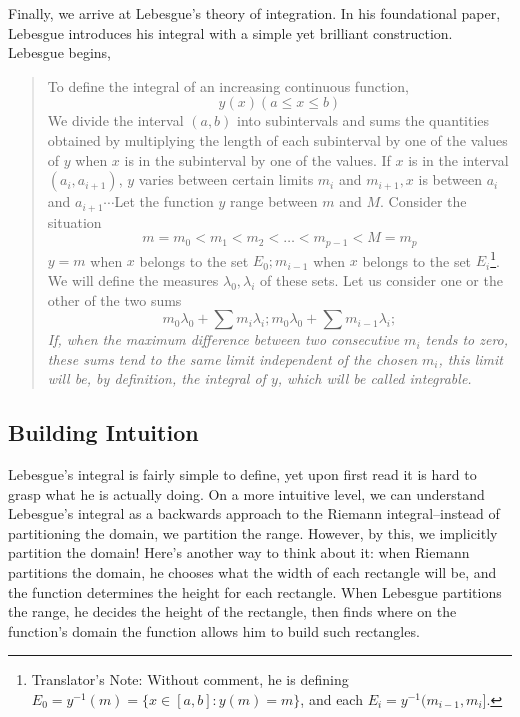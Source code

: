 \documentclass{article}
\theoremstyle{axiom} \newtheorem{axiom}{Axiom}
\theoremstyle{definition} \newtheorem{definition}{Definition}
\theoremstyle{example} \newtheorem{example}{Example}
\theoremstyle{proposition} \newtheorem{prop}{Proposition}
\theoremstyle{lemma} \newtheorem{lemma}{Lemma}
\begin{document}
Finally, we arrive at Lebesgue's theory of integration. In his foundational
paper, Lebesgue introduces his integral with a simple yet brilliant
construction. Lebesgue begins,

\begin{quote}
	To define the integral of an increasing continuous function,
	\begin{equation*}
		y(x) (a\leq x \leq b)
	\end{equation*}
	We divide the interval $(a,b)$ into subintervals and sums the quantities
	obtained by multiplying the length of each subinterval by one of the values 
	of $y$ when $x$ is in the subinterval by one of the values. If $x$ is in
	the interval $(a_i,a_{i+1})$, $y$ varies between certain limits 
	$m_i$ and $m_{i+1},x$ is between $a_i$ and $a_{i+1}$$\cdots$Let the function 
	$y$ range between $m$ and $M$. Consider the situation
	\begin{equation*}
		m = m_0 < m_1 < m_2 < \ldots < m_{p-1} < M = m_p
	\end{equation*}
	$y =m$ when $x$ belongs to the set $E_0; m_{i-1}$ when $x$ belongs to the set
	$E_i$\footnote{Translator's Note: Without comment, he is defining $E_0 = y^{-1}(m) = \{x \in
	[a,b]: y(m) = m\}$, and each $E_i = y^{-1}(m_{i-1},m_i]$.}. We will define
	the measures $\lambda_0,\lambda_i$ of these sets. Let us consider one or the
	other of the two sums
	\begin{equation*}
		m_0\lambda_0+\sum m_i\lambda_i;
		m_0\lambda_0+\sum m_{i-1}\lambda_i;
	\end{equation*}
	\textit{If, when the maximum difference between two consecutive $m_i$ tends
	to zero, these sums tend to the same limit independent of the chosen $m_i$,
	this limit will be, by definition, the integral of $y$, which will be called
	integrable.}
\end{quote}

\subsection{Building Intuition}

Lebesgue's integral is fairly simple to define, yet upon first read it is hard 
to grasp what he is actually doing. On a more intuitive level, we can
understand Lebesgue's integral as a backwards  approach to the Riemann
integral--instead of partitioning the domain, we partition the range. However,
by this, we implicitly partition the domain! Here's another way to think about
it: when Riemann partitions the domain, he chooses what the width of each
rectangle will be, and the function determines the height for each rectangle. 
When Lebesgue partitions the range, he decides the height of the rectangle, 
then finds where on the function's domain the function allows him to build 
such rectangles.
\end{document}
